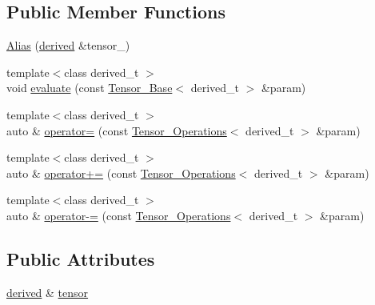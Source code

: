 \subsection*{Public Member Functions}
\begin{DoxyCompactItemize}
\item 
\hyperlink{structBC_1_1tensors_1_1Tensor__Operations_1_1Alias_a06d50719913df4504f95fa9434feec59}{Alias} (\hyperlink{structBC_1_1tensors_1_1Tensor__Operations_a830b9a11262226b18af9caef7b9da13b}{derived} \&tensor\+\_\+)
\item 
{\footnotesize template$<$class derived\+\_\+t $>$ }\\void \hyperlink{structBC_1_1tensors_1_1Tensor__Operations_1_1Alias_acb6ccf58661a0287132cb663bf226dd1}{evaluate} (const \hyperlink{classBC_1_1tensors_1_1Tensor__Base}{Tensor\+\_\+\+Base}$<$ derived\+\_\+t $>$ \&param)
\item 
{\footnotesize template$<$class derived\+\_\+t $>$ }\\auto \& \hyperlink{structBC_1_1tensors_1_1Tensor__Operations_1_1Alias_a912f631ff113e101d805c173d768730f}{operator=} (const \hyperlink{structBC_1_1tensors_1_1Tensor__Operations}{Tensor\+\_\+\+Operations}$<$ derived\+\_\+t $>$ \&param)
\item 
{\footnotesize template$<$class derived\+\_\+t $>$ }\\auto \& \hyperlink{structBC_1_1tensors_1_1Tensor__Operations_1_1Alias_aae3c94fdcf94eb4f1f013ffc13ffbfa8}{operator+=} (const \hyperlink{structBC_1_1tensors_1_1Tensor__Operations}{Tensor\+\_\+\+Operations}$<$ derived\+\_\+t $>$ \&param)
\item 
{\footnotesize template$<$class derived\+\_\+t $>$ }\\auto \& \hyperlink{structBC_1_1tensors_1_1Tensor__Operations_1_1Alias_aa606030666fc0afaea28bbc117d22265}{operator-\/=} (const \hyperlink{structBC_1_1tensors_1_1Tensor__Operations}{Tensor\+\_\+\+Operations}$<$ derived\+\_\+t $>$ \&param)
\end{DoxyCompactItemize}
\subsection*{Public Attributes}
\begin{DoxyCompactItemize}
\item 
\hyperlink{structBC_1_1tensors_1_1Tensor__Operations_a830b9a11262226b18af9caef7b9da13b}{derived} \& \hyperlink{structBC_1_1tensors_1_1Tensor__Operations_1_1Alias_aa945b2ca6a06c2d4533699c271cead7b}{tensor}
\end{DoxyCompactItemize}


